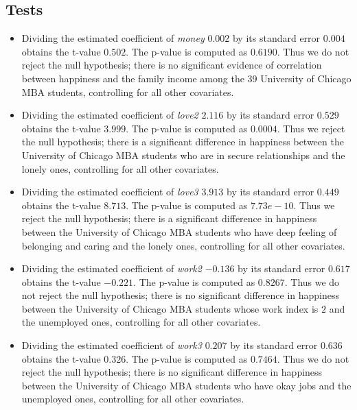 \documentclass[11pt,letterpaper]{article}
\begin{document}
\subsection{Tests}
\begin{itemize}
\item Dividing the estimated coefficient of \emph{money} $0.002$ by its standard error $0.004$ obtains the t-value $\mathbf{0.502}$. The p-value is computed as $0.6190$. Thus we do not reject the null hypothesis; there is no significant evidence of correlation between happiness and the family income among the 39 University of Chicago MBA students, controlling for all other covariates.

\item Dividing the estimated coefficient of \emph{love2} $2.116$ by its standard error $0.529$ obtains the t-value $\mathbf{3.999}$. The p-value is computed as $0.0004$. Thus we reject the null hypothesis; there is a significant difference in happiness between the University of Chicago MBA students who are in secure relationships and the lonely ones, controlling for all other covariates.

\item Dividing the estimated coefficient of \emph{love3} $3.913$ by its standard error $0.449$ obtains the t-value $\mathbf{8.713}$. The p-value is computed as $7.73e-10$. Thus we reject the null hypothesis; there is a significant difference in happiness between the University of Chicago MBA students who have deep feeling of belonging and caring and the lonely ones, controlling for all other covariates.

\item Dividing the estimated coefficient of \emph{work2} $-0.136$ by its standard error $0.617$ obtains the t-value $\mathbf{-0.221}$. The p-value is computed as $0.8267$. Thus we do not reject the null hypothesis; there is no significant difference in happiness between the University of Chicago MBA students whose work index is $2$ and the unemployed ones, controlling for all other covariates.

\item Dividing the estimated coefficient of \emph{work3} $0.207$ by its standard error $0.636$ obtains the t-value $\mathbf{0.326}$. The p-value is computed as $0.7464$. Thus we do not reject the null hypothesis; there is no significant difference in happiness between the University of Chicago MBA students who have okay jobs and the unemployed ones, controlling for all other covariates.


\end{itemize}
\end{document}
